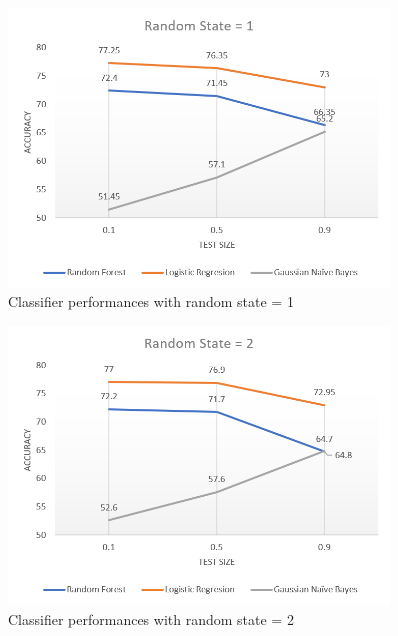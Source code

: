 \documentclass[]{IEEEtran}
\begin{document}
\begin{figure}[ht]
    \centering
    \begin{minipage}{0.5\textwidth}
        \centering
        \includegraphics[width=0.9\textwidth]{RS1.png}
        \caption{Classifier performances with random state = 1 \label{rs1}}
    \end{minipage}\hfill
    \end{figure}
\begin{figure}[ht]
    \begin{minipage}{0.5\textwidth}
        \centering
        \includegraphics[width=0.9\textwidth]{RS2.png}
        \caption{Classifier performances with random state = 2 \label{rs2}}
    \end{minipage}\hfill
    \end{figure}
\end{document}
